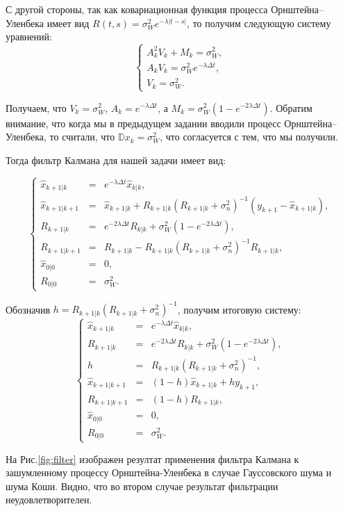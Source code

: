С другой стороны, так как ковариационная функция процесса Орнштейна--Уленбека 
 имеет вид \( R(t,s)=\sigma^2_We^{-\lambda|t-s|} \), то получим следующую 
 систему уравнений:
\[
\left\lbrace
\begin{array}{lcr}
A_k^2V_k+M_k=\sigma_W^2,\\
A_kV_k=\sigma_W^2e^{-\lambda\Delta t},\\
V_k=\sigma_W^2.
\end{array}
\right.
\]

Получаем, что \( V_k=\sigma_W^2 \), \( A_k=e^{-\lambda\Delta t} \), а 
 \( M_k=\sigma_W^2(1-e^{-2\lambda\Delta t}) \). Обратим внимание, что 
 когда мы в предыдущем задании вводили процесс Орнштейна--Уленбека, то 
 считали, что \( \mathbb{D}x_k=\sigma_W^2 \), что согласуется с тем, что 
 мы получили.

Тогда фильтр Калмана для нашей задачи имеет вид:

\[
\left\lbrace
\begin{array}{rcl}
\hat{x}_{k+1|k}&=&e^{-\lambda\Delta t}\hat{x}_{k|k},\\
\hat{x}_{k+1|k+1}&=&\hat{x}_{k+1|k}+R_{k+1|k}(R_{k+1|k}+\sigma_n^2)^{-1}
 (y_{k+1}-\hat{x}_{k+1|k}),\\
R_{k+1|k}&=&e^{-2\lambda\Delta t}R_{k|k}+\sigma^2_W(1-e^{-2\lambda\Delta t}),\\
R_{k+1|k+1}&=&R_{k+1|k}-R_{k+1|k}(R_{k+1|k}+\sigma^2_n)^{-1}R_{k+1|k},\\
\hat{x}_{0|0}&=&0,\\
R_{0|0}&=&\sigma^2_W.
\end{array}
\right.
\]

Обозначив \( h=R_{k+1|k}(R_{k+1|k}+\sigma^2_n)^{-1} \), получим итоговую 
 систему:
\[
\left\lbrace
\begin{array}{rcl}
\hat{x}_{k+1|k}&=&e^{-\lambda\Delta t}\hat{x}_{k|k},\\
R_{k+1|k}&=&e^{-2\lambda\Delta t}R_{k|k}+\sigma^2_W(1-e^{-2\lambda\Delta t}),\\
h&=&R_{k+1|k}(R_{k+1|k}+\sigma^2_n)^{-1},\\
\hat{x}_{k+1|k+1}&=&(1-h)\hat{x}_{k+1|k}+hy_{k+1},\\
R_{k+1|k+1}&=&(1-h)R_{k+1|k},\\
\hat{x}_{0|0}&=&0,\\
R_{0|0}&=&\sigma^2_W.
\end{array}
\right.
\]

На Рис.\eqref{fig:filter} изображен резултат применения фильтра Калмана к
 зашумленному процессу Орнштейна-Уленбека в случае Гауссовского шума и шума 
 Коши. Видно, что во втором случае результат фильтрации неудовлетворителен.

